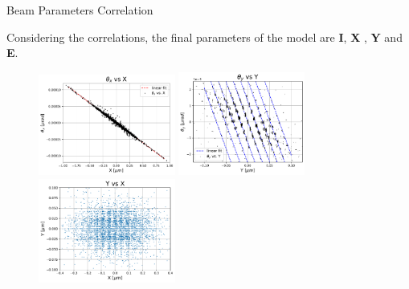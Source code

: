 \documentclass[9pt,a4paper]{beamer}
\begin{document}
\begin{frame}{Beam Parameters Correlation}

Considering the correlations, the final parameters of the model are \textbf{I}, \textbf{X} , \textbf{Y} and \textbf{E}.

\begin{figure}
\includegraphics[width = 0.4\textwidth]{figures/X_Xp.pdf}
\includegraphics[width = 0.37\textwidth]{figures/Y_Yp.pdf} \\
\includegraphics[width = 0.4\textwidth]{figures/Y_X.pdf}
\end{figure}
\end{frame}
\end{document}
